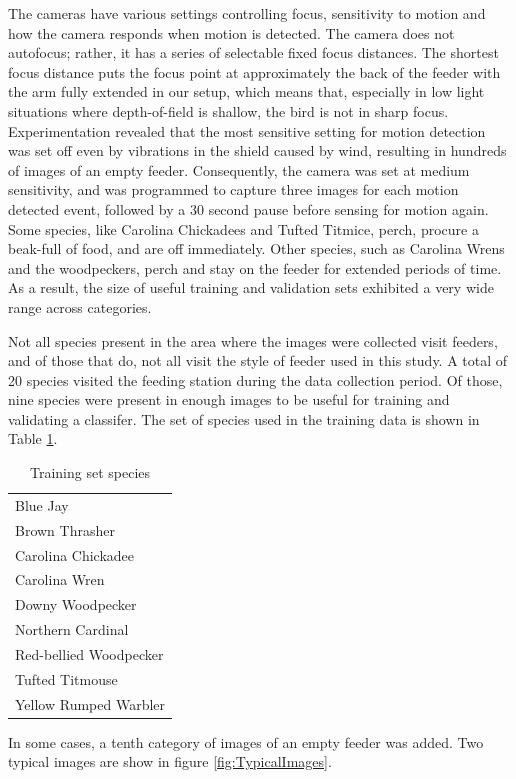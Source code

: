 \documentclass[11pt,twocolumn]{article}
\begin{document}
The cameras have various settings controlling focus,  sensitivity to motion
and how the camera responds when motion is detected. The camera does not
autofocus; rather, it has a series of selectable fixed focus distances.
The shortest focus distance puts the focus point at approximately the
back of the feeder with the arm fully extended in our setup, which means
that, especially in low light situations where depth-of-field is shallow,
the bird is not in sharp focus. Experimentation revealed that the most
sensitive setting for motion detection was set off even by vibrations
in the shield caused by wind, resulting in hundreds of images of an
empty feeder. Consequently, the camera was set at medium sensitivity,
and was programmed to capture three images for each motion detected
event, followed by a 30 second pause before sensing for motion again.
Some species, like Carolina Chickadees and Tufted Titmice, perch,
procure a beak-full of food, and are off immediately. Other species,
such as Carolina Wrens and the woodpeckers, perch and stay on the
feeder for extended periods of time. As a result, the size of useful
training and validation sets exhibited a very wide range across categories.

Not all species present in the area where the images were collected
visit feeders, and of those that do, not all visit the style of
feeder used in this study. A total of 20 species visited
the feeding station during the data collection period. Of those,
nine species were present in enough images to be useful for
training and validating a classifer. The set of species used in the
training data is shown in Table \ref{table:species}.
\begin{table}[h]
  \small
  \caption{Training set species}
  \label{table:species}
  \begin{center}
    \begin{tabular}{l}
      \hline
      Blue Jay \\ 
      Brown Thrasher \\ 
      Carolina Chickadee \\ 
      Carolina Wren \\ 
      Downy Woodpecker  \\ 
      Northern Cardinal \\ 
      Red-bellied Woodpecker \\ 
      Tufted Titmouse \\ 
      Yellow Rumped Warbler \\ \hline
    \end{tabular}
  \end{center}
\end{table}
In some cases, a tenth category of images of an empty feeder
was added. 
Two typical images are show in figure \ref{fig:TypicalImages}.
\end{document}
